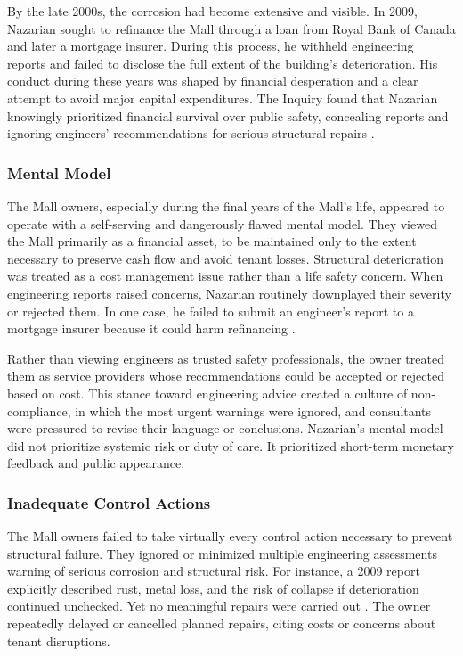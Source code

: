 \documentclass[12pt]{article}
\begin{document}
By the late 2000s, the corrosion had become extensive and visible. In 2009, Nazarian sought to refinance the Mall through a loan from Royal Bank of Canada and later a mortgage insurer. During this process, he withheld engineering reports and failed to disclose the full extent of the building's deterioration. His conduct during these years was shaped by financial desperation and a clear attempt to avoid major capital expenditures. The Inquiry found that Nazarian knowingly prioritized financial survival over public safety, concealing reports and ignoring engineers' recommendations for serious structural repairs \cite[p346-248]{AlgoLakeReport1}.

\subsubsection*{Mental Model}

The Mall owners, especially during the final years of the Mall's life, appeared to operate with a self-serving and dangerously flawed mental model. They viewed the Mall primarily as a financial asset, to be maintained only to the extent necessary to preserve cash flow and avoid tenant losses. Structural deterioration was treated as a cost management issue rather than a life safety concern. When engineering reports raised concerns, Nazarian routinely downplayed their severity or rejected them. In one case, he failed to submit an engineer's report to a mortgage insurer because it could harm refinancing \cite[p246-247]{AlgoLakeReport1}.

Rather than viewing engineers as trusted safety professionals, the owner treated them as service providers whose recommendations could be accepted or rejected based on cost. This stance toward engineering advice created a culture of non-compliance, in which the most urgent warnings were ignored, and consultants were pressured to revise their language or conclusions. Nazarian's mental model did not prioritize systemic risk or duty of care. It prioritized short-term monetary feedback and public appearance.

\subsubsection*{Inadequate Control Actions}

The Mall owners failed to take virtually every control action necessary to prevent structural failure. They ignored or minimized multiple engineering assessments warning of serious corrosion and structural risk. For instance, a 2009 report explicitly described rust, metal loss, and the risk of collapse if deterioration continued unchecked. Yet no meaningful repairs were carried out \cite[p245-246]{AlgoLakeReport1}. The owner repeatedly delayed or cancelled planned repairs, citing costs or concerns about tenant disruptions.
\end{document}
